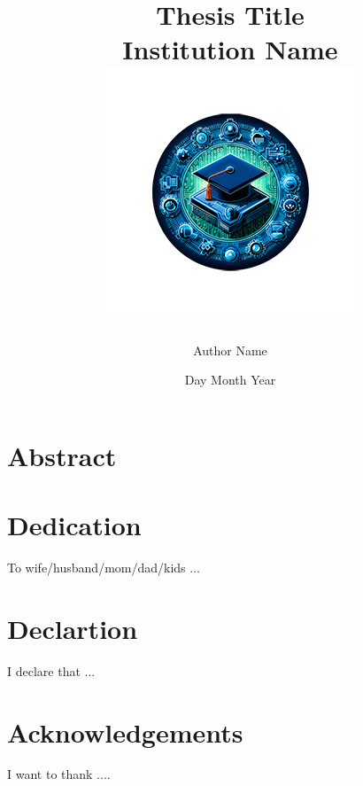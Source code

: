 \documentclass[12pt,twoside]{report}
\title{
	{Thesis Title}\\
	{\large Institution Name}\\
	{\includegraphics{university.png}}
}
\author{Author Name}
\date{Day Month Year}
\begin{document}
	
\maketitle

\chapter*{Abstract}	
\lipsum[1]


\chapter*{Dedication}
To wife/husband/mom/dad/kids ...

\chapter*{Declartion}
I declare that ...

\chapter*{Acknowledgements}
I want to thank .... 

\tableofcontents







%
%





	
\end{document}
